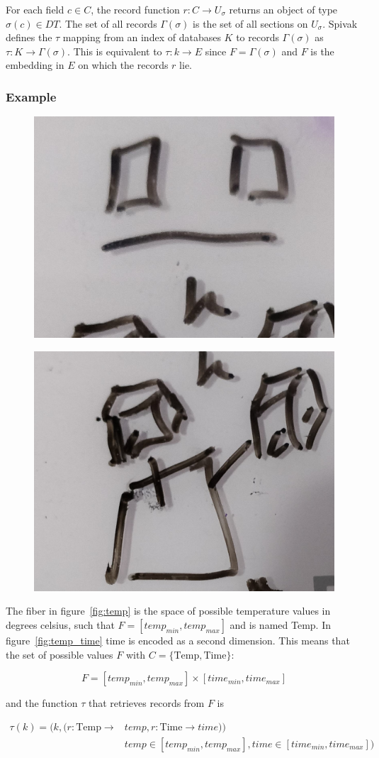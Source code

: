 \documentclass[../main.tex]{subfiles}
\begin{document}
For each field $c \in C$, the record function $r: C \rightarrow U_{\sigma}$ returns an object of type $\sigma(c) \in DT$. The set of all records $\Gamma(\sigma)$ is the set of all sections on $U_\sigma$. Spivak defines the $\tau$ mapping from an index of databases $K$ to records $\Gamma(\sigma)$ as $\tau: K \rightarrow \Gamma(\sigma)$. This is equivalent to $\tau: k \rightarrow E$ since $F = \Gamma(\sigma)$ and $F$ is the embedding in $E$ on which the records $r$ lie.
 
\subsubsection{Example}
\begin{figure}[H]
    \includegraphics[width=0.2\linewidth]{figures/sections/math/temp_2f.png}
    \label{fig:}
\end{figure}
\begin{figure}[H]
    \includegraphics[width=0.2\linewidth]{figures/sections/math/temp_3f.png}
\end{figure}


The fiber in figure~\ref{fig:temp} is the space of possible temperature values in degrees celsius, such that $F=[temp_{min}, temp_{max}]$ and is named \textrm{Temp}. In figure~\ref{fig:temp_time} \textrm{time} is encoded as a second dimension. This means that the set of possible values $F$ with $C=\{\textrm{Temp}, \textrm{Time}\}$:

\begin{equation}
F = [temp_{min}, temp_{max}] \times [time_{min}, time_{max}]
\end{equation}

and the function $\tau$ that retrieves records from $F$ is

\begin{align}
\tau(k) =(k, (r: \textrm{Temp}\rightarrow &temp, r: \textrm{Time}\rightarrow time))\\
&temp \in [temp_{min}, temp_{max}], time \in [time_{min}, time_{max}])
\end{align}
\end{document}
